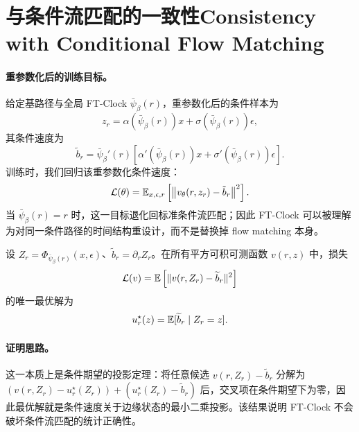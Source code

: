 \section{\ifinternalcn 与条件流匹配的一致性\else Consistency with Conditional Flow Matching\fi}

\ifinternalcn
\paragraph{重参数化后的训练目标。}
给定基路径与全局 FT-Clock $\bar{\psi}_{\beta}(r)$，重参数化后的条件样本为
\begin{equation}
  z_r = \alpha(\bar{\psi}_{\beta}(r))x + \sigma(\bar{\psi}_{\beta}(r))\epsilon,
\end{equation}
其条件速度为
\begin{equation}
  \tilde{b}_r
  =
  \bar{\psi}_{\beta}'(r)
  \left[
    \alpha'(\bar{\psi}_{\beta}(r))x
    +
    \sigma'(\bar{\psi}_{\beta}(r))\epsilon
  \right].
\end{equation}
训练时，我们回归该重参数化条件速度：
\begin{equation}
  \mathcal{L}(\theta)
  =
  \mathbb{E}_{x,\epsilon,r}
  \left[
    \left\|v_{\theta}(r,z_r)-\tilde{b}_r\right\|^2
  \right].
\end{equation}
当 $\bar{\psi}_{\beta}(r)=r$ 时，这一目标退化回标准条件流匹配；因此 FT-Clock 可以被理解为对同一条件路径的时间结构重设计，而不是替换掉 flow matching 本身。

\begin{theorem}[最优解为重参数化桥的边缘向量场]
设 $Z_r=\Phi_{\bar{\psi}_{\beta}(r)}(x,\epsilon)$、$\widetilde{b}_r=\partial_r Z_r$。在所有平方可积可测函数 $v(r,z)$ 中，损失
\begin{equation}
  \mathcal{L}(v) = \mathbb{E}\left[\|v(r,Z_r)-\widetilde{b}_r\|^2\right]
\end{equation}
的唯一最优解为
\begin{equation}
  u_r^\star(z)=\mathbb{E}[\widetilde{b}_r \mid Z_r=z].
\end{equation}
\end{theorem}

\paragraph{证明思路。}
这一本质上是条件期望的投影定理：将任意候选 $v(r,Z_r)-\widetilde{b}_r$ 分解为
\(
  (v(r,Z_r)-u_r^\star(Z_r)) + (u_r^\star(Z_r)-\widetilde{b}_r)
\)
后，交叉项在条件期望下为零，因此最优解就是条件速度关于边缘状态的最小二乘投影。该结果说明 FT-Clock 不会破坏条件流匹配的统计正确性。

